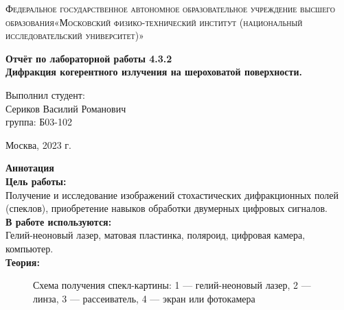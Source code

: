 \documentclass[a4paper, 12pt]{article}%
\begin{document}
	\begin{titlepage}
		\begin{center}
			\textsc{Федеральное государственное автономное образовательное учреждение высшего образования«Московский физико-технический институт (национальный исследовательский университет)»\\[5mm]
			}
			
			\vfill
			
			\textbf{Отчёт по лабораторной работы 4.3.2\\[3mm]
				Дифракция когерентного излучения на шероховатой поверхности.
				\\[50mm]
			}
			
		\end{center}
		
		\hfill
		\begin{minipage}{.5\textwidth}
			Выполнил студент:\\[2mm]
			Сериков Василий Романович\\[2mm]
			группа: Б03-102\\[5mm]
			
		\end{minipage}
		\vfill
		\begin{center}
			Москва, 2023 г.
		\end{center}
		
	\end{titlepage}
	
	\newpage
	\setcounter{page}{2}
	\textbf{Аннотация}\\
	
	\textbf{Цель работы: }\\
	
	Получение и исследование изображений стохастических дифракционных полей (спеклов), приобретение навыков обработки двумерных цифровых сигналов.\\
	
	\textbf{В работе используются:}\\
	
	 Гелий-неоновый лазер, матовая пластинка, поляроид, цифровая камера, компьютер.\\
	 
	 
	 \textbf{Теория: }\\
	 
	 \begin{figure}[H]
	 	\caption{Схема получения спекл-картины: 1 — гелий-неоновый лазер, 2 — линза, 3 — рассеиватель, 4 — экран или фотокамера}
	 \end{figure}
	
\end{document}
